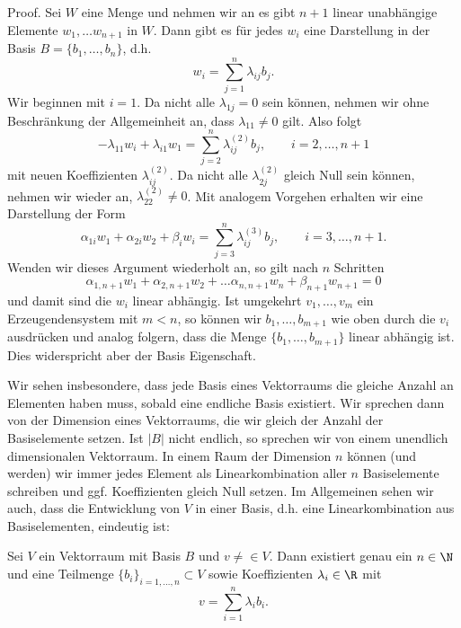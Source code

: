 \documentclass[letterpaper,10pt,english]{jupyterBook}
\begin{document}
\begin{emphBox}{}{}
Proof.  Sei \(W\) eine  Menge und nehmen wir an es gibt \(n+1\) linear unabhängige Elemente \(w_1, \ldots w_{n+1}\) in \(W\). Dann gibt es für jedes \(w_i\) eine Darstellung in der Basis \(B=\{b_1,\ldots,b_n\}\), d.h.
\begin{equation*}
 w_i =  \sum_{j=1}^n \lambda_{ij} b_j.
\end{equation*}
Wir beginnen mit \(i=1\). Da nicht alle \(\lambda_{1j} =0 \) sein können, nehmen wir ohne Beschränkung der Allgemeinheit an, dass \(\lambda_{11} \neq 0\) gilt. Also folgt
\begin{equation*}
 - \lambda_{11} w_i + \lambda_{i1} w_1 = \sum_{j=2}^n \lambda_{ij}^{(2)}  b_j, \qquad i=2,\ldots,n+1
\end{equation*}
mit neuen Koeffizienten \(\lambda_{ij}^{(2)}\). Da nicht alle \(\lambda_{2j}^{(2)} \) gleich Null sein können, nehmen wir wieder an, \(\lambda_{22}^{(2)} \neq 0\). Mit analogem Vorgehen erhalten wir eine Darstellung der Form
\begin{equation*}
 \alpha_{1i} w_1 + \alpha_{2i} w_2 + \beta_i w_i = \sum_{j=3}^n \lambda_{ij}^{(3)}  b_j, \qquad i=3,\ldots,n+1.
\end{equation*}
Wenden wir dieses Argument wiederholt an, so gilt nach \(n\) Schritten
\begin{equation*}
 \alpha_{1,n+1} w_1 + \alpha_{2,n+1} w_2 + \ldots \alpha_{n,n+1} w_n + \beta_{n+1} w_{n+1} = 0
\end{equation*}
und damit sind die \(w_i\) linear abhängig.
Ist umgekehrt \(v_1, \ldots, v_m\) ein Erzeugendensystem mit \(m<n\), so können wir \(b_1,\ldots,b_{m+1}\) wie oben durch die \(v_i\) ausdrücken und analog folgern, dass die Menge \(\{b_1,\ldots,b_{m+1}\}\) linear abhängig ist. Dies widerspricht aber der Basis Eigenschaft.
\end{emphBox}

Wir sehen insbesondere, dass jede Basis eines Vektorraums die gleiche Anzahl an Elementen haben muss, sobald eine endliche Basis existiert. Wir sprechen dann von der Dimension eines Vektorraums, die wir gleich der Anzahl der Basiselemente setzen. Ist \(|B|\) nicht endlich, so sprechen wir von einem unendlich dimensionalen Vektorraum. In einem Raum der Dimension \(n\) können (und werden) wir immer jedes Element als Linearkombination aller \(n\) Basiselemente schreiben und ggf. Koeffizienten gleich Null setzen.
Im Allgemeinen sehen wir auch, dass die Entwicklung von \(V\) in einer Basis, d.h. eine Linearkombination aus Basiselementen, eindeutig ist:
\label{vektorraeume/vektorraeume:theorem-11}
\begin{theorem}{}{}



Sei \(V\) ein Vektorraum mit Basis \(B\) und \(v \neq \in V\). Dann existiert genau ein \(n \in \N\) und eine Teilmenge \(\{b_i\}_{i=1,\ldots,n} \subset V\) sowie Koeffizienten \(\lambda_i \in \R\) mit
\begin{equation*}
 v =  \sum_{i=1}^n \lambda_i b_i .
\end{equation*}\end{theorem}
\end{document}
